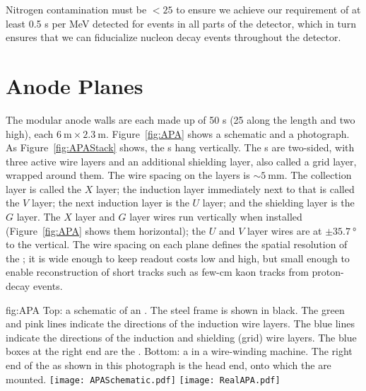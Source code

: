 Nitrogen contamination must be $<\!25$  to ensure we achieve our requirement of at least 0.5 \phel{}s per MeV detected for events in all parts of the detector, which in turn ensures 
that we can fiducialize nucleon decay events throughout the detector.

\section{Anode Planes}
\label{sec:exec-sp-apa}

The modular anode walls are each made up of 50 s (25 along the  length and two high), each $\SI{6}{\meter}\times\SI{2.3}{\meter}$. Figure~\ref{fig:APA} shows a schematic and a photograph. As Figure~\ref{fig:APAStack} shows, the s hang vertically. The s are two-sided, with three active wire layers and an additional shielding layer, also called a grid layer, wrapped around them. The wire spacing on the layers is $\sim\!\SI{5}{\mm}$. The collection layer is called the $X$ layer; the induction layer immediately next to that is called the $V$ layer; the next induction layer is the $U$ layer; and the shielding layer is the $G$ layer. The $X$ layer and $G$ layer wires run vertically when installed  (Figure~\ref{fig:APA} shows them horizontal); the $U$ and $V$ layer wires are at $\pm\SI{35.7}{\degree}$ to the vertical. The 
wire spacing on each plane defines the spatial resolution of the ; it is wide enough to keep readout costs low and  high, but small enough to enable reconstruction of 
short tracks such as few-\si{\cm} kaon tracks from proton-decay events.

\begin{dunefigure}{fig:APA}
{Top: a schematic of an . The steel  frame is shown in black. The green and pink lines indicate the directions of the induction wire layers. The blue lines indicate the directions of the induction and shielding (grid) wire layers. The blue boxes at the right end  are the . Bottom: a   in a wire-winding machine. The right end of the  as shown in this photograph is the head end, onto which the  are mounted.}
\texttt{[image: APASchematic.pdf]}
\texttt{[image: RealAPA.pdf]}
\end{dunefigure}

